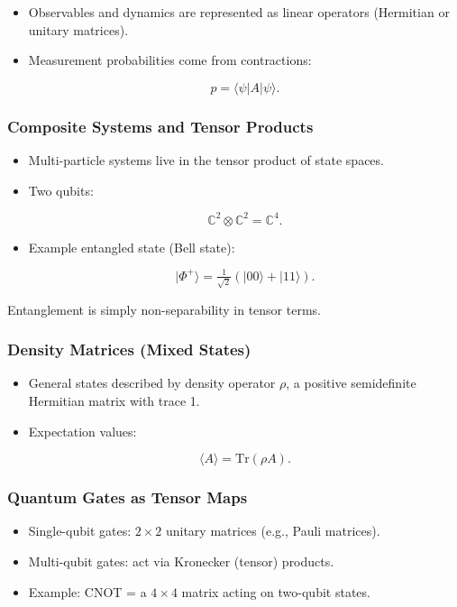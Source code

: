 \documentclass[
  letterpaper,
  DIV=11,
  numbers=noendperiod]{scrreprt}
\providecommand{\tightlist}{%
  \setlength{\itemsep}{0pt}\setlength{\parskip}{0pt}}
\begin{document}
\begin{itemize}
\item
  Observables and dynamics are represented as linear operators
  (Hermitian or unitary matrices).
\item
  Measurement probabilities come from contractions:

  \[
  p = \langle \psi | A | \psi \rangle.
  \]
\end{itemize}

\subsubsection{Composite Systems and Tensor
Products}\label{composite-systems-and-tensor-products}

\begin{itemize}
\item
  Multi-particle systems live in the tensor product of state spaces.
\item
  Two qubits:

  \[
  \mathbb{C}^2 \otimes \mathbb{C}^2 = \mathbb{C}^4.
  \]
\item
  Example entangled state (Bell state):

  \[
  |\Phi^+\rangle = \tfrac{1}{\sqrt{2}} (|00\rangle + |11\rangle).
  \]
\end{itemize}

Entanglement is simply non-separability in tensor terms.

\subsubsection{Density Matrices (Mixed
States)}\label{density-matrices-mixed-states}

\begin{itemize}
\item
  General states described by density operator \(\rho\), a positive
  semidefinite Hermitian matrix with trace 1.
\item
  Expectation values:

  \[
  \langle A \rangle = \mathrm{Tr}(\rho A).
  \]
\end{itemize}

\subsubsection{Quantum Gates as Tensor
Maps}\label{quantum-gates-as-tensor-maps}

\begin{itemize}
\tightlist
\item
  Single-qubit gates: \(2 \times 2\) unitary matrices (e.g., Pauli
  matrices).
\item
  Multi-qubit gates: act via Kronecker (tensor) products.
\item
  Example: CNOT = a \(4 \times 4\) matrix acting on two-qubit states.
\end{itemize}
\end{document}
